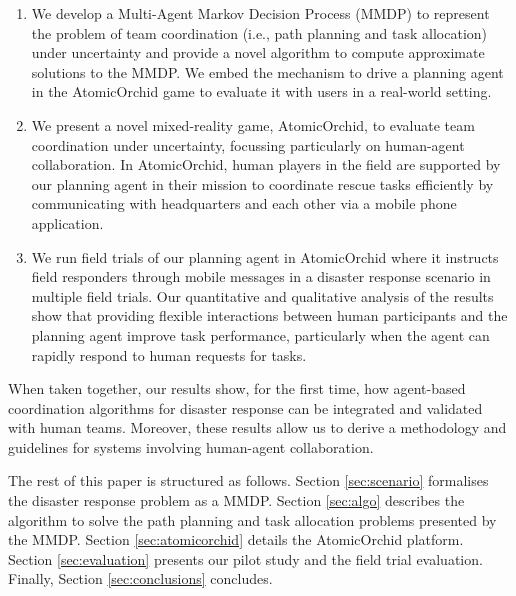\begin{enumerate}
\item We develop a Multi-Agent Markov Decision Process (MMDP) to represent the problem of  team coordination  (i.e., path planning and task allocation) under uncertainty \cite{boutilier1996planning} and provide a novel algorithm to compute approximate solutions to the MMDP.  We embed the mechanism to drive a planning  agent in the AtomicOrchid game to evaluate it with users in a real-world setting. 
\item We present a novel mixed-reality game, AtomicOrchid, to evaluate team coordination under uncertainty, focussing particularly on human-agent collaboration. In AtomicOrchid, human players in the field are supported by our planning agent in their mission to coordinate rescue tasks efficiently by communicating with headquarters and each other via a mobile phone application.
\item We run field trials of our planning  agent in AtomicOrchid where it  instructs field responders through mobile messages in a disaster response scenario in multiple field trials. Our quantitative and qualitative analysis of the results show that providing flexible interactions between human participants and the planning agent improve task performance, particularly when the agent can rapidly respond to human requests for tasks. 
\end{enumerate}
When taken together, our results show, for the first time, how agent-based coordination algorithms for disaster response can be integrated and validated with human teams. Moreover, these results allow us to derive a methodology and guidelines  for systems involving  human-agent collaboration. 

The rest of this paper is structured as follows. Section \ref{sec:scenario} formalises the disaster response problem as a MMDP. Section \ref{sec:algo}  describes the algorithm to solve the path planning and task allocation problems presented by the MMDP. Section \ref{sec:atomicorchid}  details the AtomicOrchid platform. Section \ref{sec:evaluation} presents our pilot study and the  field trial evaluation.  Finally, Section \ref{sec:conclusions} concludes.
